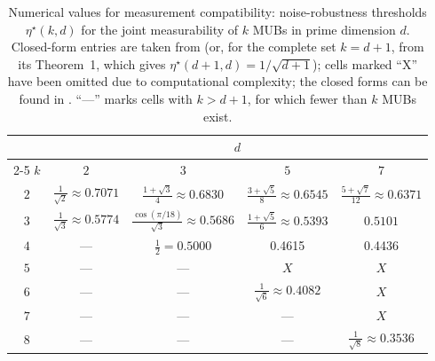 \documentclass[oneside, a4paper, onecolumn, 11pt]{article}
\theoremstyle{definition}
\theoremstyle{plain}
\theoremstyle{remark}
\begin{document}
\begin{table}[h]
  \centering
  \caption{Numerical values for measurement compatibility:
           noise-robustness thresholds $\eta^{\star}(k, d)$ for the joint
           measurability of $k$ MUBs in prime dimension $d$. Closed-form
           entries are taken from \cite{Designolle2019} (or, for the
           complete set $k = d+1$, from its Theorem~1, which gives
           $\eta^{\star}(d+1, d) = 1/\sqrt{d+1}$); cells marked ``X''
           have been omitted due to computational complexity; the closed forms can be found in \cite{Designolle2019}. ``---'' marks
           cells with $k > d+1$, for which fewer than $k$ MUBs exist.}
  \label{tab:compat-prime}
  \renewcommand{\arraystretch}{1.4}
  \begin{tabular}{c|cccc}
    \hline
        & \multicolumn{4}{c}{$d$} \\
    \cline{2-5}
    $k$ & $2$ & $3$ & $5$ & $7$ \\
    \hline
    $2$ & $\tfrac{1}{\sqrt{2}}\!\approx\!0.7071$
        & $\tfrac{1+\sqrt{3}}{4}\!\approx\!0.6830$
        & $\tfrac{3+\sqrt{5}}{8}\!\approx\!0.6545$
        & $\tfrac{5+\sqrt{7}}{12}\!\approx\!0.6371$ \\
    $3$ & $\tfrac{1}{\sqrt{3}}\!\approx\!0.5774$
        & $\tfrac{\cos(\pi/18)}{\sqrt{3}}\!\approx\!0.5686$
        & $\tfrac{1+\sqrt{5}}{6}\!\approx\!0.5393$
        & $0.5101$ \\
    $4$ & ---
        & $\tfrac{1}{2}=0.5000$
        & 0.4615  &  0.4436 \\
    $5$ & ---
        & ---
        & $X$
        & $X$ \\
    $6$ & ---
        & ---
        & $\tfrac{1}{\sqrt{6}}\!\approx\!0.4082$
        & $X$ \\
    $7$ & ---
        & ---
        & ---
        & $X$ \\
    $8$ & ---
        & ---
        & ---
        & $\tfrac{1}{\sqrt{8}}\!\approx\!0.3536$ \\
    \hline
  \end{tabular}
\end{table}
\end{document}

